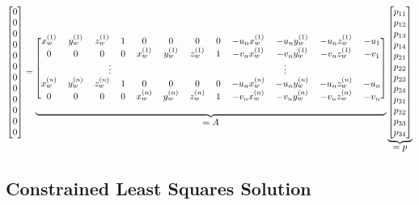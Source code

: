 \setcounter{MaxMatrixCols}{20}
\begin{equation}
    \scalemath{0.9}{
    \begin{bmatrix}
        0 \\ 0 \\ 0 \\ 0 \\ 0 \\ 0 \\ 0 \\ 0 \\ 0 \\ 0 \\ 0 \\ 0
    \end{bmatrix}
    =
    \underbrace{
        \begin{blockarray}{[*{12}c]}
            x_w^{(1)} & y_w^{(1)} & z_w^{(1)} & 1 & 0         & 0         & 0         & 0 & -u_nx_w^{(1)} & -u_ny_w^{(1)} & -u_nz_w^{(1)} & -u_1 \\
            0         & 0         & 0         & 0 & x_w^{(1)} & y_w^{(1)} & z_w^{(1)} & 1 & -v_nx_w^{(1)} & -v_ny_w^{(1)} & -v_nz_w^{(1)} & -v_1 \\
            \BAmulticolumn{6}{c}{\vdots} & \BAmulticolumn{6}{c}{\vdots} \\
            x_w^{(n)} & y_w^{(n)} & z_w^{(n)} & 1 & 0         & 0         & 0         & 0 & -u_nx_w^{(n)} & -u_ny_w^{(n)} & -u_nz_w^{(n)} & -u_n \\
            0         & 0         & 0         & 0 & x_w^{(n)} & y_w^{(n)} & z_w^{(n)} & 1 & -v_nx_w^{(n)} & -v_ny_w^{(n)} & -v_nz_w^{(n)} & -v_n
        \end{blockarray}
    }_{\mathlarger{=A}}
    \underbrace{
        \begin{bmatrix}
            p_{11} \\ p_{12} \\ p_{13} \\ p_{14} \\ p_{21} \\ p_{22} \\ p_{23} \\ p_{24} \\ p_{31} \\ p_{32} \\ p_{33} \\ p_{34}
        \end{bmatrix}
    }_{\mathlarger{=p}}
    }
\end{equation}

\subsection{Constrained Least Squares Solution}

